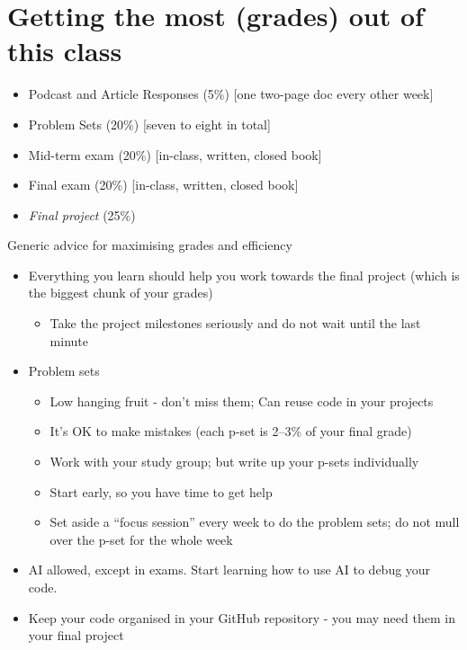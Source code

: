 \documentclass[
  11pt,
  letterpaper]{article}
\providecommand{\tightlist}{%
  \setlength{\itemsep}{0pt}\setlength{\parskip}{0pt}}
\begin{document}
\section{Getting the most (grades) out of this
class}\label{getting-the-most-grades-out-of-this-class}

\begin{itemize}
\tightlist
\item
  Podcast and Article Responses (5\%) {[}one two-page doc every other
  week{]}
\item
  Problem Sets (20\%) {[}seven to eight in total{]}
\item
  Mid-term exam (20\%) {[}in-class, written, closed book{]}
\item
  Final exam (20\%) {[}in-class, written, closed book{]}
\item
  \emph{Final project} (25\%)
\end{itemize}

\newpage

Generic advice for maximising grades and efficiency

\begin{itemize}
\tightlist
\item
  Everything you learn should help you work towards the final project
  (which is the biggest chunk of your grades)

  \begin{itemize}
  \tightlist
  \item
    Take the project milestones seriously and do not wait until the last
    minute
  \end{itemize}
\item
  Problem sets

  \begin{itemize}
  \tightlist
  \item
    Low hanging fruit - don't miss them; Can reuse code in your projects
  \item
    It's OK to make mistakes (each p-set is 2--3\% of your final grade)
  \item
    Work with your study group; but write up your p-sets individually
  \item
    Start early, so you have time to get help
  \item
    Set aside a ``focus session'' every week to do the problem sets; do
    not mull over the p-set for the whole week
  \end{itemize}
\item
  AI allowed, except in exams. Start learning how to use AI to debug
  your code.
\item
  Keep your code organised in your GitHub repository - you may need them
  in your final project
\end{itemize}
\end{document}
